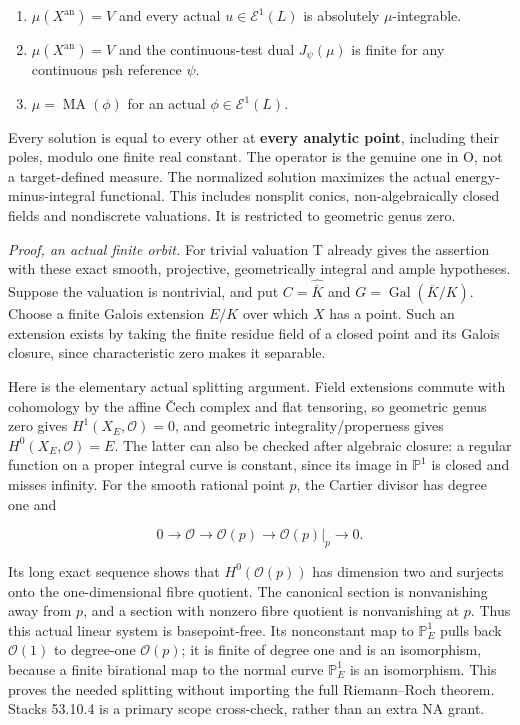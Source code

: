 \documentclass[
  11pt,
]{article}
\providecommand{\tightlist}{%
  \setlength{\itemsep}{0pt}\setlength{\parskip}{0pt}}
\begin{document}
\begin{enumerate}
\def\labelenumi{\arabic{enumi}.}
\tightlist
\item
  \(\mu(X^{\mathrm{an}})=V\) and every actual \(u\in\mathcal E^1(L)\) is
  absolutely \(\mu\)-integrable.
\item
  \(\mu(X^{\mathrm{an}})=V\) and the continuous-test dual
  \(J_\psi(\mu)\) is finite for any continuous psh reference \(\psi\).
\item
  \(\mu=\operatorname{MA}(\phi)\) for an actual
  \(\phi\in\mathcal E^1(L)\).
\end{enumerate}

Every solution is equal to every other at \textbf{every analytic point},
including their poles, modulo one finite real constant. The operator is
the genuine one in O, not a target-defined measure. The normalized
solution maximizes the actual energy-minus-integral functional. This
includes nonsplit conics, non-algebraically closed fields and
nondiscrete valuations. It is restricted to geometric genus zero.

\emph{Proof, an actual finite orbit.} For trivial valuation T already
gives the assertion with these exact smooth, projective, geometrically
integral and ample hypotheses. Suppose the valuation is nontrivial, and
put \(C=\widehat{\overline K}\) and
\(G=\operatorname{Gal}(\overline K/K)\). Choose a finite Galois
extension \(E/K\) over which \(X\) has a point. Such an extension exists
by taking the finite residue field of a closed point and its Galois
closure, since characteristic zero makes it separable.

Here is the elementary actual splitting argument. Field extensions
commute with cohomology by the affine Čech complex and flat tensoring,
so geometric genus zero gives \(H^1(X_E,\mathcal O)=0\), and geometric
integrality/properness gives \(H^0(X_E,\mathcal O)=E\). The latter can
also be checked after algebraic closure: a regular function on a proper
integral curve is constant, since its image in \(\mathbb P^1\) is closed
and misses infinity. For the smooth rational point \(p\), the Cartier
divisor has degree one and

\[
0\longrightarrow\mathcal O\longrightarrow\mathcal O(p)
 \longrightarrow\mathcal O(p)|_p\longrightarrow0.
\]

Its long exact sequence shows that \(H^0(\mathcal O(p))\) has dimension
two and surjects onto the one-dimensional fibre quotient. The canonical
section is nonvanishing away from \(p\), and a section with nonzero
fibre quotient is nonvanishing at \(p\). Thus this actual linear system
is basepoint-free. Its nonconstant map to \(\mathbb P^1_E\) pulls back
\(\mathcal O(1)\) to degree-one \(\mathcal O(p)\); it is finite of
degree one and is an isomorphism, because a finite birational map to the
normal curve \(\mathbb P^1_E\) is an isomorphism. This proves the needed
splitting without importing the full Riemann--Roch theorem. Stacks
53.10.4 is a primary scope cross-check, rather than an extra NA grant.
\end{document}
